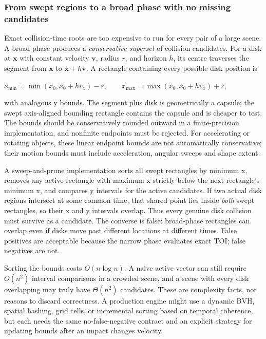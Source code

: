 \subsubsection{From swept regions to a broad phase with no missing candidates}\label{04-visual-computing-ii-ch026-from-swept-regions-to-a-broad-phase-with-no-missing-candidates}

\hypertarget{04-visual-computing-ii-ch026-from-swept-regions-to-a-broad-phase-with-no-missing-candidates}{}

Exact collision-time roots are too expensive to run for every pair of a large scene. A broad phase produces a \emph{conservative superset} of collision candidates. For a disk at \(\mathbf x\) with constant velocity \(\mathbf v\), radius \(r\), and horizon \(h\), its centre traverses the segment from \(\mathbf x\) to \(\mathbf x+h\mathbf v\). A rectangle containing every possible disk position is

\(x_{\min}=\min(x_0,x_0+hv_x)-r,\qquad x_{\max}=\max(x_0,x_0+hv_x)+r,\)

with analogous y bounds. The segment plus disk is geometrically a capsule; the swept axis-aligned bounding rectangle contains the capsule and is cheaper to test. The bounds should be conservatively rounded outward in a finite-precision implementation, and nonfinite endpoints must be rejected. For accelerating or rotating objects, these linear endpoint bounds are not automatically conservative; their motion bounds must include acceleration, angular sweeps and shape extent.

A sweep-and-prune implementation sorts all swept rectangles by minimum x, removes any active rectangle with maximum x strictly below the next rectangle's minimum x, and compares y intervals for the active candidates. If two actual disk regions intersect at some common time, that shared point lies inside \emph{both} swept rectangles, so their x and y intervals overlap. Thus every genuine disk collision must survive as a candidate. The converse is false: broad-phase rectangles can overlap even if disks move past different locations at different times. False positives are acceptable because the narrow phase evaluates exact TOI; false negatives are not.

Sorting the bounds costs \(O(n\log n)\). A naive active vector can still require \(O(n^2)\) interval comparisons in a crowded scene, and a scene with every disk overlapping may truly have \(\Theta(n^2)\) candidates. These are complexity facts, not reasons to discard correctness. A production engine might use a dynamic BVH, spatial hashing, grid cells, or incremental sorting based on temporal coherence, but each needs the same no-false-negative contract and an explicit strategy for updating bounds after an impact changes velocity.


